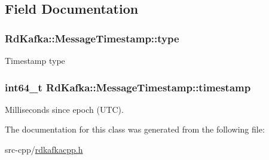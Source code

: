 \subsection{Field Documentation}
\hypertarget{classRdKafka_1_1MessageTimestamp_aa6efe71306d83563f18d3da2554941fa}{
\subsubsection[{type}]{ {\bf RdKafka::MessageTimestamp::type}}}
\label{classRdKafka_1_1MessageTimestamp_aa6efe71306d83563f18d3da2554941fa}
Timestamp type \hypertarget{classRdKafka_1_1MessageTimestamp_a5b5b599eeaba1b9cf89d0da436707086}{
\subsubsection[{timestamp}]{\setlength{\rightskip}{0pt plus 5cm}int64\_\-t {\bf RdKafka::MessageTimestamp::timestamp}}}
\label{classRdKafka_1_1MessageTimestamp_a5b5b599eeaba1b9cf89d0da436707086}
Milliseconds since epoch (UTC). 

The documentation for this class was generated from the following file:\begin{DoxyCompactItemize}
\item 
src-\/cpp/\hyperlink{rdkafkacpp_8h}{rdkafkacpp.h}\end{DoxyCompactItemize}
